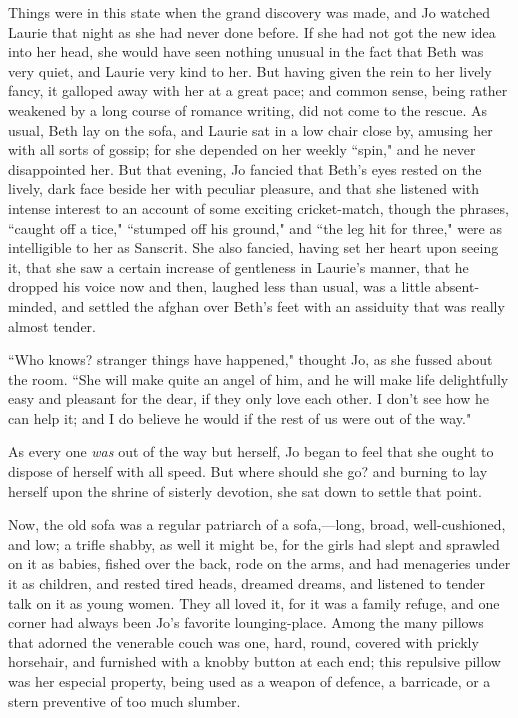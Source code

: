 Things were in this state when the grand discovery was made, and Jo
watched Laurie that night as she had never done before. If she had not
got the new idea into her head, she would have seen nothing unusual in
the fact that Beth was very quiet, and Laurie very kind to her. But
having given the rein to her lively fancy, it galloped away with her at
a great pace; and common sense, being rather weakened by a long course
of romance writing, did not come to the rescue. As usual, Beth lay on
the sofa, and Laurie sat in a low chair close by, amusing her with all
sorts of gossip; for she depended on her weekly ``spin," and he never
disappointed her. But that evening, Jo fancied that
Beth's eyes rested on the lively, dark face beside her
with peculiar pleasure, and that she listened with intense interest to
an account of some exciting cricket-match, though the phrases, ``caught
off a tice," ``stumped off his ground," and ``the leg hit for three," were
as intelligible to her as Sanscrit. She also fancied, having set her
heart upon seeing it, that she saw a certain increase of gentleness in
Laurie's manner, that he dropped his voice now and then,
laughed less than usual, was a little absent-minded, and settled the
afghan over Beth's feet with an assiduity that was
really almost tender.

``Who knows? stranger things have happened," thought Jo, as she fussed
about the room. ``She will make quite an angel of him, and he will make
life delightfully easy and pleasant for the dear, if they only love each
other. I don't see how he can help it; and I do believe
he would if the rest of us were out of the way."

As every one \emph{was} out of the way but herself, Jo began to feel
that she ought to dispose of herself with all speed. But where should
she go? and burning to lay herself upon the shrine of sisterly devotion,
she sat down to settle that point.

Now, the old sofa was a regular patriarch of a sofa,---long, broad,
well-cushioned, and low; a trifle shabby, as well it might be, for the
girls had slept and sprawled on it as babies, fished over the back, rode
on the arms, and had menageries under it as children, and rested tired
heads, dreamed dreams, and listened to tender talk on it as young women.
They all loved it, for it was a family refuge, and one corner had always
been Jo's favorite lounging-place. Among the many
pillows that adorned the venerable couch was one, hard, round, covered
with prickly horsehair, and furnished with a knobby button at each end;
this repulsive pillow was her especial property, being used as a weapon
of defence, a barricade, or a stern preventive of too much slumber.

